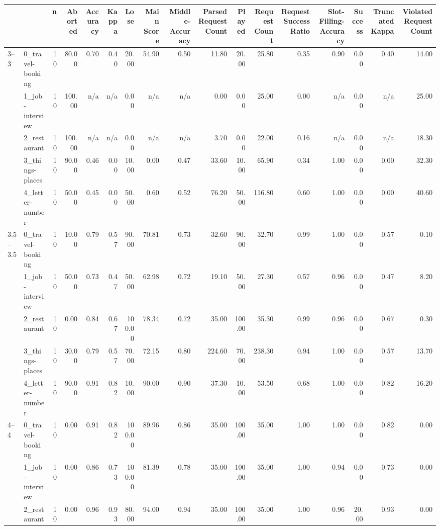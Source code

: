 \begin{tabular}{llrrrrrrrrrrrrrrr}
\toprule
 &  & n & Aborted & Accuracy & Kappa & Lose & Main Score & Middle-Accuracy & Parsed Request Count & Played & Request Count & Request Success Ratio & Slot-Filling-Accuracy & Success & Truncated Kappa & Violated Request Count \\
\midrule
\multirow[t]{5}{*}{3--3} & 0_travel-booking & 10 & 80.00 & 0.70 & 0.40 & 20.00 & 54.90 & 0.50 & 11.80 & 20.00 & 25.80 & 0.35 & 0.90 & 0.00 & 0.40 & 14.00 \\
 & 1_job-interview & 10 & 100.00 & n/a & n/a & 0.00 & n/a & n/a & 0.00 & 0.00 & 25.00 & 0.00 & n/a & 0.00 & n/a & 25.00 \\
 & 2_restaurant & 10 & 100.00 & n/a & n/a & 0.00 & n/a & n/a & 3.70 & 0.00 & 22.00 & 0.16 & n/a & 0.00 & n/a & 18.30 \\
 & 3_things-places & 10 & 90.00 & 0.46 & 0.00 & 10.00 & 0.00 & 0.47 & 33.60 & 10.00 & 65.90 & 0.34 & 1.00 & 0.00 & 0.00 & 32.30 \\
 & 4_letter-number & 10 & 50.00 & 0.45 & 0.00 & 50.00 & 0.60 & 0.52 & 76.20 & 50.00 & 116.80 & 0.60 & 1.00 & 0.00 & 0.00 & 40.60 \\
\cline{1-17}
\multirow[t]{5}{*}{3.5--3.5} & 0_travel-booking & 10 & 10.00 & 0.79 & 0.57 & 90.00 & 70.81 & 0.73 & 32.60 & 90.00 & 32.70 & 0.99 & 1.00 & 0.00 & 0.57 & 0.10 \\
 & 1_job-interview & 10 & 50.00 & 0.73 & 0.47 & 50.00 & 62.98 & 0.72 & 19.10 & 50.00 & 27.30 & 0.57 & 0.96 & 0.00 & 0.47 & 8.20 \\
 & 2_restaurant & 10 & 0.00 & 0.84 & 0.67 & 100.00 & 78.34 & 0.72 & 35.00 & 100.00 & 35.30 & 0.99 & 0.96 & 0.00 & 0.67 & 0.30 \\
 & 3_things-places & 10 & 30.00 & 0.79 & 0.57 & 70.00 & 72.15 & 0.80 & 224.60 & 70.00 & 238.30 & 0.94 & 1.00 & 0.00 & 0.57 & 13.70 \\
 & 4_letter-number & 10 & 90.00 & 0.91 & 0.82 & 10.00 & 90.00 & 0.90 & 37.30 & 10.00 & 53.50 & 0.68 & 1.00 & 0.00 & 0.82 & 16.20 \\
\cline{1-17}
\multirow[t]{5}{*}{4--4} & 0_travel-booking & 10 & 0.00 & 0.91 & 0.82 & 100.00 & 89.96 & 0.86 & 35.00 & 100.00 & 35.00 & 1.00 & 1.00 & 0.00 & 0.82 & 0.00 \\
 & 1_job-interview & 10 & 0.00 & 0.86 & 0.73 & 100.00 & 81.39 & 0.78 & 35.00 & 100.00 & 35.00 & 1.00 & 0.94 & 0.00 & 0.73 & 0.00 \\
 & 2_restaurant & 10 & 0.00 & 0.96 & 0.93 & 80.00 & 94.00 & 0.94 & 35.00 & 100.00 & 35.00 & 1.00 & 0.96 & 20.00 & 0.93 & 0.00 \\

\end{tabular}
